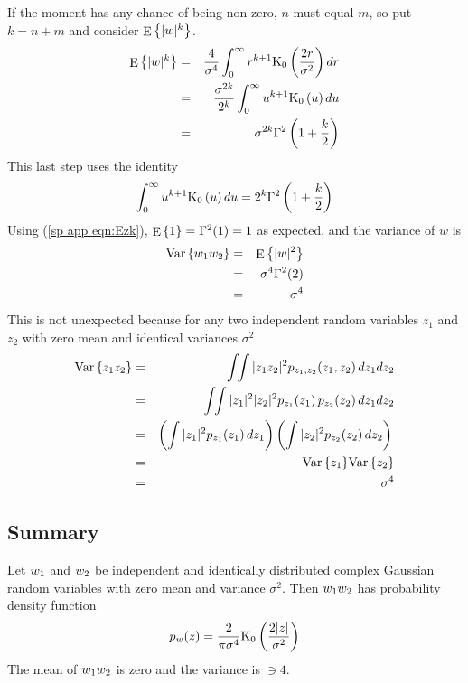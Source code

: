 If the moment has any chance of being non-zero, $n$ must equal $m$, so put $k=n+m$ and
consider ${\mathop{\rm E}\nolimits\left\{|{w}|^k\right\}}$.
\begin{eqnarray}
{\mathop{\rm E}\nolimits\left\{|{w}|^k\right\}}&=&\frac{4}{{\sigma^{4}}}\int_0^{\infty}r^{k+1}{\mathop{\rm K_0}\nolimits\left(\frac{2r}{{\sigma^2}}\right)}\,dr{\nonumber}\\
&=&\frac{{\sigma^{2k}}}{2^k}\int_0^{\infty}u^{k+1}{\mathop{\rm K_0}\nolimits\left(u\right)}\,du{\nonumber}\\
&=&{\sigma^{2k}}\Gamma^2\left(1+\frac{k}{2}\right)
\label{sp app eqn:Ezk}
\end{eqnarray}
This last step uses the identity \cite[eq. 11.4.22]{Abr65}
\begin{equation}
\int_0^{\infty}u^{k+1}{\mathop{\rm K_0}\nolimits\left(u\right)}\,du=2^k\Gamma^2\left(1+\frac{k}{2}\right)
\end{equation}
Using (\ref{sp app eqn:Ezk}), ${\mathop{\rm E}\nolimits\left\{1\right\}}=\Gamma^2(1)=1$ as expected, and the
variance of $w$ is
\begin{eqnarray}
{\mathop{\rm Var}\nolimits\left\{{w_1}{w_2}\right\}}&=&{\mathop{\rm E}\nolimits\left\{|{w}|^2\right\}}{\nonumber}\\
&=&{\sigma^{4}}\Gamma^2(2){\nonumber}\\
&=&{\sigma^{4}}
\end{eqnarray}
This is not unexpected because for any two independent random variables
$z_1$ and $z_2$ with zero mean and identical variances $\sigma^2$
\begin{eqnarray}
{\mathop{\rm Var}\nolimits\left\{z_1z_2\right\}}&=&\int\!\!\int |z_1z_2|^2{p}_{z_1,z_2}(z_1,z_2)\,dz_1dz_2{\nonumber}\\
&=&\int\!\!\int |z_1|^2|z_2|^2{p}_{z_1}(z_1)\,{p}_{z_2}(z_2)\,dz_1dz_2{\nonumber}\\
&=&\left(\int |z_1|^2{p}_{z_1}(z_1)\,dz_1\right)
\left(\int |z_2|^2{p}_{z_2}(z_2)\,dz_2\right){\nonumber}\\
&=&{\mathop{\rm Var}\nolimits\left\{z_1\right\}}{\mathop{\rm Var}\nolimits\left\{z_2\right\}}{\nonumber}\\
&=&\sigma^4
\end{eqnarray}

\subsection{Summary}

Let ${w_1}$ and ${w_2}$ be independent and identically distributed complex
Gaussian random variables with zero mean and variance $\sigma^2$.  
Then ${w_1}{w_2}$ has probability density function
\begin{equation}
{p}_{{w}}(z)=\frac{2}{\pi{\sigma^{4}}}{\mathop{\rm K_0}\nolimits\left(\frac{2|z|}{{\sigma^2}}\right)}
\end{equation}
The mean of ${w_1}{w_2}$ is zero and the variance is $\ni{4}$.

\endgroup
